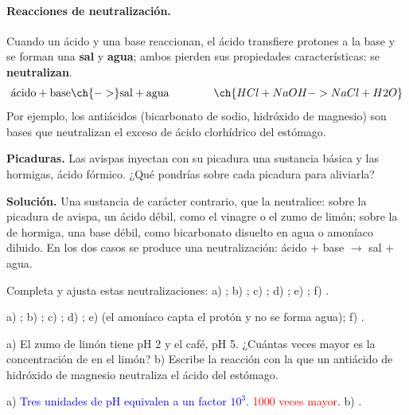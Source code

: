 \paragraph{Reacciones de neutralización.} Cuando un ácido y una base reaccionan, el ácido transfiere protones a la base y se
forman una \textbf{sal} y \textbf{agua}; ambos pierden sus propiedades características: se \textbf{neutralizan}.
\[ \text{ácido} + \text{base} \ch{->} \text{sal} + \text{agua} \qquad\qquad \ch{HCl + NaOH -> NaCl + H2O} \]
Por ejemplo, los antiácidos (bicarbonato de sodio, hidróxido de magnesio) son bases que neutralizan el exceso de ácido clorhídrico
del estómago.

\begin{example}
    \textbf{Picaduras.} Las avispas inyectan con su picadura una sustancia básica y las hormigas, ácido fórmico. ¿Qué pondrías sobre
    cada picadura para aliviarla?

    \textbf{Solución.} Una sustancia de carácter contrario, que la neutralice: sobre la picadura de avispa, un ácido débil, como el
    vinagre o el zumo de limón; sobre la de hormiga, una base débil, como bicarbonato disuelto en agua o amoníaco diluido. En los dos
    casos se produce una neutralización: ácido + base \(\rightarrow\) sal + agua.
\end{example}

\begin{exercise}
    Completa y ajusta estas neutralizaciones: a) ; b) ;
    c) ; d) ; e) ; f) .
    \begin{solu}
        a) \textcolor{red}{}; b) \textcolor{red}{};
        c) \textcolor{red}{}; d) \textcolor{red}{};
        e) \textcolor{red}{} (el amoníaco capta el protón y no se forma agua);
        f) \textcolor{red}{}.
    \end{solu}
\end{exercise}

\begin{exercise}
    a) El zumo de limón tiene pH 2 y el café, pH 5. ¿Cuántas veces mayor es la concentración de  en el limón? b) Escribe la
    reacción con la que un antiácido de hidróxido de magnesio neutraliza el ácido del estómago.
    \begin{solu}
        a) \textcolor{blue}{Tres unidades de pH equivalen a un factor \(10^3\).} \textcolor{red}{1000 veces mayor}.
        b) \textcolor{red}{}.
    \end{solu}
\end{exercise}

